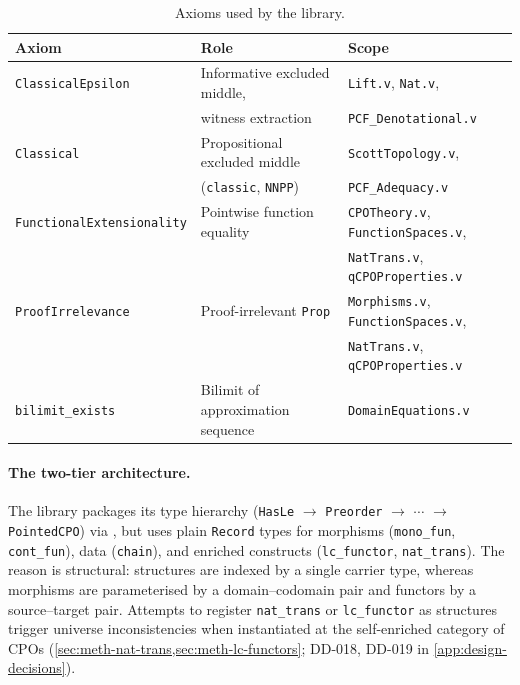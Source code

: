 \begin{table}[ht]
\centering
\caption{Axioms used by the library.}
\label{tab:axiom-budget}
\small
\begin{tabular}{@{}l l l@{}}
\toprule
\textbf{Axiom} & \textbf{Role} & \textbf{Scope} \\
\midrule
\texttt{ClassicalEpsilon}
  & Informative excluded middle,
  & \texttt{Lift.v}, \texttt{Nat.v}, \\
  & witness extraction
  & \texttt{PCF\_Denotational.v} \\[3pt]
\texttt{Classical}
  & Propositional excluded middle
  & \texttt{ScottTopology.v}, \\
  & (\texttt{classic}, \texttt{NNPP})
  & \texttt{PCF\_Adequacy.v} \\[3pt]
\texttt{FunctionalExtensionality}
  & Pointwise function equality
  & \texttt{CPOTheory.v}, \texttt{FunctionSpaces.v}, \\
  & & \texttt{NatTrans.v}, \texttt{qCPOProperties.v} \\[3pt]
\texttt{ProofIrrelevance}
  & Proof-irrelevant \texttt{Prop}
  & \texttt{Morphisms.v}, \texttt{FunctionSpaces.v}, \\
  & & \texttt{NatTrans.v}, \texttt{qCPOProperties.v} \\[3pt]
\texttt{bilimit\_exists}
  & Bilimit of approximation sequence
  & \texttt{DomainEquations.v} \\
\bottomrule
\end{tabular}
\end{table}


\paragraph{The two-tier architecture.}
The library packages its type hierarchy
(\texttt{HasLe} $\to$ \texttt{Preorder} $\to$ $\cdots$ $\to$
\texttt{PointedCPO}) via \HB{}, but uses plain \texttt{Record} types
for morphisms (\texttt{mono\_fun}, \texttt{cont\_fun}), data
(\texttt{chain}), and enriched constructs (\texttt{lc\_functor},
\texttt{nat\_trans}).
The reason is structural: \HB{} structures are indexed by a single
carrier type, whereas morphisms are parameterised by a
domain--codomain pair and functors by a source--target pair.
Attempts to register \texttt{nat\_trans} or \texttt{lc\_functor} as
\HB{} structures trigger universe inconsistencies when instantiated
at the self-enriched category of CPOs
(\cref{sec:meth-nat-trans,sec:meth-lc-functors}; DD-018, DD-019 in
\cref{app:design-decisions}).

